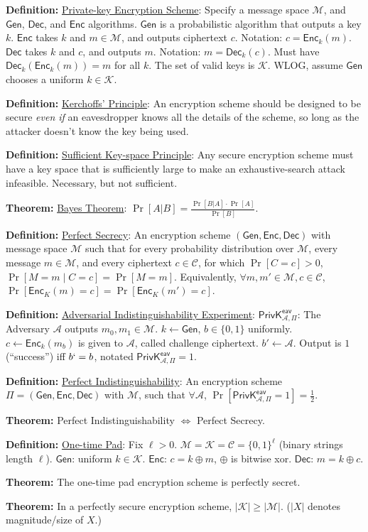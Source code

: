 \documentclass[12pt]{article}
\newcommand{\AAA}{\mathcal{A}}
\newcommand{\CCC}{\mathcal{C}}
\newcommand{\KKK}{\mathcal{K}}
\newcommand{\MMM}{\mathcal{M}}
\newcommand{\defn}[1]{{\bf Definition:} \underline{#1}}
\newcommand{\thm}[1]{{\bf Theorem:} \underline{#1}}
\newcommand{\Enc}{\mathsf{Enc}}
\newcommand{\Dec}{\mathsf{Dec}}
\newcommand{\Gen}{\mathsf{Gen}}
\newcommand{\GenEncDec}{(\Gen,\Enc,\Dec)}
\newcommand{\ExptEavArgs}[2]{\mathsf{PrivK}^{\mathsf{eav}}_{#1,#2}}
\newcommand{\ExptEav}{\ExptEavArgs{\AAA}{\Pi}}
\newcommand{\xor}{\oplus}
\newcommand{\from}{\leftarrow}
\begin{document}
\scriptsize
\begin{multicols}{3}

\defn{Private-key Encryption Scheme}: Specify a message space $\MMM$, and $\Gen$, $\Dec$, and $\Enc$ algorithms. $\Gen$ is a probabilistic algorithm that outputs a key $k$. $\Enc$ takes $k$ and $m\in\MMM$, and outputs ciphertext $c$. Notation: $c=\Enc_k(m)$. $\Dec$ takes $k$ and $c$, and outputs $m$. Notation: $m=\Dec_k(c)$. Must have $\Dec_k(\Enc_k(m))=m$ for all $k$. The set of valid keys is $\KKK$. WLOG, assume $\Gen$ chooses a uniform $k\in\KKK$.

\defn{Kerchoffs' Principle}: An encryption scheme should be designed to be secure {\it even if} an eavesdropper knows all the details of the scheme, so long as the attacker doesn't know the key being used. 

\defn{Sufficient Key-space Principle}: Any secure encryption scheme must have a key space that is sufficiently large to make an exhaustive-search attack infeasible. Necessary, but not sufficient.

\thm{Bayes Theorem}: $\Pr[A|B]=\frac{\Pr[B|A]\cdot\Pr[A]}{\Pr[B]}$.

\defn{Perfect Secrecy}: An encryption scheme $\GenEncDec$ with message space $\MMM$ such that for every probability distribution over $\MMM$, every message $m\in \MMM$, and every ciphertext $c\in\CCC$, for which $\Pr[C=c]>0$, $\Pr[M=m\mid C=c]=\Pr[M=m]$. Equivalently, $\forall m,m'\in\MMM,c\in\CCC$, $\Pr[\Enc_K(m)=c]=\Pr[\Enc_K(m')=c]$.

\defn{Adversarial Indistinguishability Experiment}: $\ExptEav$: The Adversary $\AAA$ outputs $m_0,m_1\in\MMM$. $k\from\Gen$, $b\in\{0,1\}$ uniformly. $c\from\Enc_k(m_b)$ is given to $\AAA$, called challenge ciphertext. $b'\from\AAA$. Output is $1$ (``success'') iff $b`=b$, notated $\ExptEav=1$.

\defn{Perfect Indistinguishability}: An encryption scheme $\Pi=\GenEncDec$ with $\MMM$, such that $\forall\AAA$, $\Pr[\ExptEav=1]=\frac{1}{2}$.

\thm{}Perfect Indistinguishability $\Leftrightarrow$ Perfect Secrecy.

\defn{One-time Pad}: Fix $\ell>0$. $\MMM=\KKK=\CCC=\{0,1\}^\ell$ (binary strings length $\ell$). $\Gen$: uniform $k\in\KKK$. $\Enc$: $c=k\xor m$, $\xor$ is bitwise xor. $\Dec$: $m=k\xor c$.

\thm{}The one-time pad encryption scheme is perfectly secret.

\thm{}In a perfectly secure encryption scheme, $|\KKK|\geq|\MMM|$. ($|X|$ denotes magnitude/size of $X$.)


\end{multicols}
\end{document}
